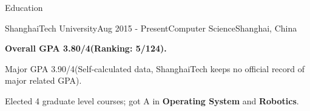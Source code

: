\documentclass{resume} %
\begin{document}

\begin{rSection}{Education}

\begin{rSubsection}
  {ShanghaiTech University}{Aug 2015 - Present}{Computer Science}{Shanghai, China}
    \item \textbf{Overall GPA 3.80/4(Ranking: 5/124).}
    \item Major GPA 3.90/4(Self-calculated data, ShanghaiTech keeps no official record of major related GPA).
    \item Elected 4 graduate level courses; got A in \textbf{Operating System} and \textbf{Robotics}.
\end{rSubsection}

%
\end{rSection}
\end{document}
